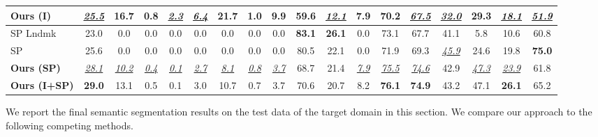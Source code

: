 \begin{table*}
{\begin{tabular}{l||c||c|c|c|c|c|c|c|c|c|c|c|c|c|c|c|c}
\textbf{Ours (I)} & \underline{\textit{25.5}} & 16.7 & \textbf{0.8} & \underline{\textit{2.3}} & \underline{\textit{6.4}} & \textbf{21.7} & \textbf{1.0} & \textbf{9.9} & 59.6 & \underline{\textit{12.1}} & 7.9 & 70.2 & \underline{\textit{67.5}} & \underline{\textit{32.0}} & 29.3 & \underline{\textit{18.1}} & \underline{\textit{51.9}}\\
\hline
SP Lndmk & { 23.0} & { 0.0} & { 0.0} & { 0.0} & { 0.0} & { 0.0} & { 0.0} & { 0.0} & \textbf{ 83.1} & \textbf{ 26.1} & { 0.0} & { 73.1} & { 67.7} & { 41.1} & { 5.8} & { 10.6} & { 60.8}\\

SP & { 25.6} & { 0.0} & { 0.0} & { 0.0} & { 0.0} & { 0.0} & { 0.0} & { 0.0} & { 80.5} & { 22.1} & { 0.0} & { 71.9} & { 69.3} &  \underline{\textit{45.9}} & { 24.6} & { 19.8} & \textbf{ 75.0}\\

\textbf{Ours (SP)} & \underline{\textit{28.1}} & \underline{\textit{10.2}} & \underline{\textit{0.4}} & \underline{\textit{0.1}} & \underline{\textit{2.7}} & \underline{\textit{8.1}} & \underline{\textit{0.8}} & \underline{\textit{3.7}} & 68.7 & 21.4 & \underline{\textit{7.9}} & \underline{\textit{75.5}} & \underline{\textit{74.6}} & 42.9 & \underline{\textit{47.3}} & \underline{\textit{23.9}} & 61.8\\
\hline
\textbf{Ours (I+SP)} & \textbf{29.0} & 13.1 & 0.5 & 0.1 & 3.0 & 10.7 & 0.7 & 3.7 & 70.6 & 20.7 & 8.2 & \textbf{76.1} & \textbf{74.9} & 43.2 & 47.1 & \textbf{26.1} & 65.2\\
\hline
\end{tabular}
}
\vspace{-8pt}
\end{table*}

We report the final semantic segmentation results on the test data of the target domain in this section. We compare our approach to the following competing methods.


